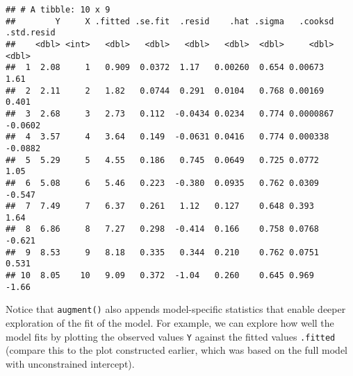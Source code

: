 \documentclass[
]{book}
\newenvironment{Shaded}{\begin{snugshade}}{\end{snugshade}}
\newcommand{\DataTypeTok}[1]{\textcolor[rgb]{0.13,0.29,0.53}{#1}}
\newcommand{\FloatTok}[1]{\textcolor[rgb]{0.00,0.00,0.81}{#1}}
\newcommand{\KeywordTok}[1]{\textcolor[rgb]{0.13,0.29,0.53}{\textbf{#1}}}
\newcommand{\NormalTok}[1]{#1}
\newcommand{\OperatorTok}[1]{\textcolor[rgb]{0.81,0.36,0.00}{\textbf{#1}}}
\newcommand{\StringTok}[1]{\textcolor[rgb]{0.31,0.60,0.02}{#1}}
\begin{document}
\begin{verbatim}
## # A tibble: 10 x 9
##        Y     X .fitted .se.fit  .resid    .hat .sigma   .cooksd .std.resid
##    <dbl> <int>   <dbl>   <dbl>   <dbl>   <dbl>  <dbl>     <dbl>      <dbl>
##  1  2.08     1   0.909  0.0372  1.17   0.00260  0.654 0.00673       1.61  
##  2  2.11     2   1.82   0.0744  0.291  0.0104   0.768 0.00169       0.401 
##  3  2.68     3   2.73   0.112  -0.0434 0.0234   0.774 0.0000867    -0.0602
##  4  3.57     4   3.64   0.149  -0.0631 0.0416   0.774 0.000338     -0.0882
##  5  5.29     5   4.55   0.186   0.745  0.0649   0.725 0.0772        1.05  
##  6  5.08     6   5.46   0.223  -0.380  0.0935   0.762 0.0309       -0.547 
##  7  7.49     7   6.37   0.261   1.12   0.127    0.648 0.393         1.64  
##  8  6.86     8   7.27   0.298  -0.414  0.166    0.758 0.0768       -0.621 
##  9  8.53     9   8.18   0.335   0.344  0.210    0.762 0.0751        0.531 
## 10  8.05    10   9.09   0.372  -1.04   0.260    0.645 0.969        -1.66
\end{verbatim}

Notice that \texttt{augment()} also appends model-specific statistics that enable deeper exploration of the fit of the model. For example, we can explore how well the model fits by plotting the observed values \texttt{Y} against the fitted values \texttt{.fitted} (compare this to the plot constructed earlier, which was based on the full model with unconstrained intercept).

\begin{Shaded}
\end{Shaded}
\end{document}
